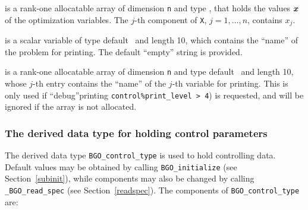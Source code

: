 \documentclass{galahad}
\newcommand{\packagename}{BGO}
\newcommand{\fullpackagename}{\libraryname\_\packagename}
\begin{document}
\begin{description}
 is a rank-one allocatable array of dimension {\tt n} and type
\realdp,
that holds the values ${\bm{x}}$ of the optimization variables.
The $j$-th component of {\tt X}, $j = 1,  \ldots , n$, contains $x_{j}$.

 is a scalar variable of type
default \character\ and length 10, which contains the
``name'' of the problem for printing. The default ``empty'' string is
provided.

 is a rank-one allocatable array of dimension {\tt n} and type
default \character\ and length 10, whose $j$-th entry contains the
``name'' of the $j$-th variable for printing. This is only used
if ``debug''printing {\tt control\%print\_level > 4}) is requested,
and will be ignored if the array is not allocated.

\end{description}


\subsubsection{The derived data type for holding control
 parameters}\label{typecontrol}
The derived data type
{\tt \packagename\_control\_type}
is used to hold controlling data. Default values may be obtained by calling
{\tt \packagename\_initialize}
(see Section~\ref{subinit}),
while components may also be changed by calling
{\tt \fullpackagename\_read\-\_spec}
(see Section~\ref{readspec}).
The components of
{\tt \packagename\_control\_type}
are:
\end{document}

